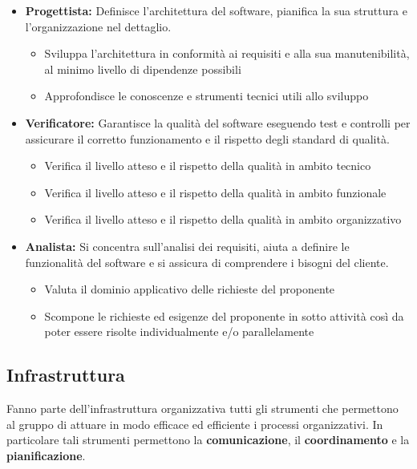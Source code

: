 \begin{itemize}
\begin{itemize}
  \end{itemize}
  \item \textbf{Progettista:} Definisce l'architettura del software, pianifica la sua struttura e l'organizzazione nel dettaglio.
	\begin{itemize}
    \item{Sviluppa l'architettura in conformità ai requisiti e alla sua manutenibilità, al minimo livello di dipendenze possibili}
    \item{Approfondisce le conoscenze e strumenti tecnici utili allo sviluppo}
  \end{itemize}
  \item \textbf{Verificatore:} Garantisce la qualità del software eseguendo test e controlli per assicurare il corretto funzionamento e il rispetto degli standard di qualità.
	\begin{itemize}
    \item{Verifica il livello atteso e il rispetto della qualità in ambito tecnico}
    \item{Verifica il livello atteso e il rispetto della qualità in ambito funzionale}
    \item{Verifica il livello atteso e il rispetto della qualità in ambito organizzativo}
  \end{itemize}
  \item \textbf{Analista:} Si concentra sull'analisi dei requisiti, aiuta a definire le funzionalità del software e si assicura di comprendere i bisogni del cliente.
  \begin{itemize}
    \item{Valuta il dominio applicativo delle richieste del proponente}
    \item{Scompone le richieste ed esigenze del proponente in sotto attività così da poter essere risolte individualmente e/o parallelamente}
  \end{itemize}
\end{itemize}

\subsection{Infrastruttura}\label{sec:infrastruttura}
Fanno parte dell'infrastruttura organizzativa tutti gli strumenti che permettono al gruppo di attuare in modo efficace ed efficiente i processi organizzativi. In particolare tali strumenti permettono la \textbf{comunicazione}, il \textbf{coordinamento} e la \textbf{pianificazione}.
